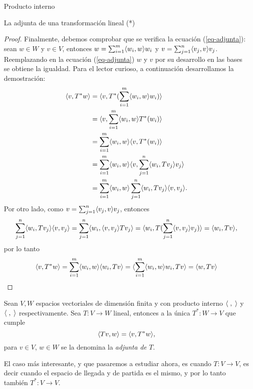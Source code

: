 \begin{chapter}{Producto interno}
\begin{section}{La adjunta de una transformaci\'on lineal (*)}
\begin{proof}
        Finalmente,  debemos comprobar que se verifica la ecuación (\ref{eq-adjunta}): sean  $w \in W$ y $v \in V$, entonces $w = \sum_{i=1}^{m} \langle w_i,w\rangle w_i$ y $v = \sum_{j=1}^{n} \langle v_j,v\rangle v_j$. Reemplazando en  la ecuación (\ref{eq-adjunta}) $w$ y $v$ por su desarrollo en las bases se obtiene la igualdad. Para el lector curioso, a continuación desarrollamos la demostración:
        \begin{align*}
            \langle v,T^*w\rangle &= 	\langle v, T^*(\sum_{i=1}^{m} \langle w_i,w\rangle w_i) \rangle\\
             &= \langle v, \sum_{i=1}^{m} \langle w_i,w\rangle T^*(w_i) \rangle\\
             &=	\sum_{i=1}^{m} \langle w_i,w\rangle\langle v,  T^*(w_i) \rangle\\
             &=\sum_{i=1}^{m} \langle w_i,w\rangle\langle v,  \sum_{j=1}^{n} \langle w_i,Tv_j\rangle v_j\rangle\\
             &=\sum_{i=1}^{m} \langle w_i,w\rangle \sum_{j=1}^{n} \langle w_i,Tv_j\rangle\langle v,  v_j\rangle.
        \end{align*}
        Por otro lado, como $v = \sum_{j=1}^{n} \langle v_j,v\rangle v_j$, entonces
        \begin{equation*}
            \sum_{j=1}^{n} \langle w_i,Tv_j\rangle\langle v,  v_j\rangle = \sum_{j=1}^{n} \langle w_i,\langle v,  v_j\rangle Tv_j\rangle = \langle w_i, T (\sum_{j=1}^{n}\langle v,  v_j\rangle v_j)\rangle = \langle w_i, T v\rangle, 
        \end{equation*}
        por lo tanto 
        \begin{equation*}
            \langle v,T^*w\rangle = \sum_{i=1}^{m} \langle w_i,w\rangle \langle w_i, T v\rangle =  \langle\sum_{i=1}^{m} \langle w_i,w\rangle w_i, T v\rangle = \langle w, T v\rangle
        \end{equation*}
        \end{proof}
        
        \begin{definicion}
            Sean $V, W$ espacios vectoriales de dimensión finita y con producto interno $\langle \;,\;\rangle$ y $\langle \;,\;\rangle$ respectivamente. Sea $T: V \to W$ lineal, entonces a la única $T^*: W \to V$ que cumple
            \begin{equation}\label{eq-adjunta}
            \langle Tv,w\rangle = \langle v,T^*w\rangle,
            \end{equation}  
            para $v\in V$, $w \in W$ se la denomina la \textit{adjunta de $T$}.
        \end{definicion}
        
        \begin{obs*} El caso más interesante, y que pasaremos a estudiar ahora, es cuando $T: V \to V$, es decir cuando el espacio de llegada y  de partida es el mismo, y por lo tanto también $T^*: V \to V$. 
        \end{obs*}
        

\end{section}
\end{chapter}
